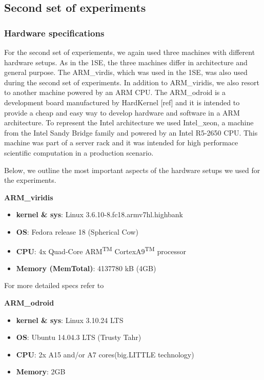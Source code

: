 \subsection{Second set of experiments}

\subsubsection*{Hardware specifications}

For the second set of experiements, we again used three machines with different hardware setups. As in the 1SE, the three machines differ in architecture and general purpose. The ARM\_virdis, which was used in the 1SE, was also used during the second set of experiments. In addition to ARM\_viridis, we also resort to another machine powered by an ARM CPU. The ARM\_odroid is a development board manufactured by HardKernel [ref] and it is intended to provide a cheap and easy way to develop hardware and software in a ARM architecture. To represent the Intel architecture we used Intel\_xeon, a machine from the Intel Sandy Bridge family and powered by an Intel R5-2650 CPU. This machine was part of a server rack and it was intended for high performace scientific computation in a production scenario.

Below, we outline the most important aspects of the hardware setups we used for the experiments.

\vspace{10mm}
\textbf{ARM\_viridis}
\begin{itemize}
  \item[] \textbf{kernel \& sys}:  Linux  3.6.10-8.fc18.armv7hl.highbank
  \item[] \textbf{OS}: Fedora release 18 (Spherical Cow)
  \item[] \textbf{CPU}:    4x Quad-Core ARM\textsuperscript{TM} CortexA9\textsuperscript{TM} processor
  \item[] \textbf{Memory  (MemTotal)}:        4137780 kB (4GB) 
\end{itemize}

For more detailed specs refer to \cite{viridis_specs}


\vspace{10mm}
\textbf{ARM\_odroid}
\begin{itemize}
  \item[] \textbf{kernel \& sys}:  Linux 3.10.24 LTS
  \item[] \textbf{OS}: Ubuntu 14.04.3 LTS (Trusty Tahr)
  \item[] \textbf{CPU}: 2x A15 and/or A7 cores(big.LITTLE technology) 
  \item[] \textbf{Memory}:        2GB
\end{itemize}

